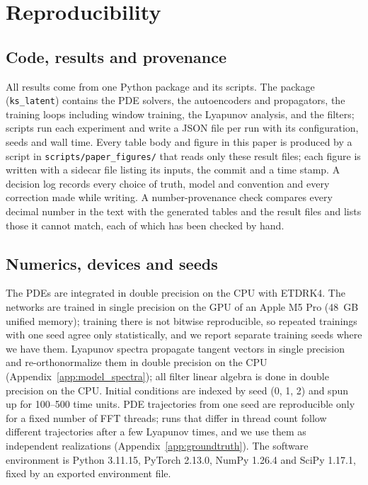 \section{Reproducibility}
\label{app:reproducibility}

\subsection{Code, results and provenance}

All results come from one Python package and its scripts. The package
(\texttt{ks\_latent}) contains the PDE solvers, the autoencoders and
propagators, the training loops including window training, the
Lyapunov analysis, and the filters; scripts run each experiment and write
a JSON file per run with its configuration, seeds and wall time. Every
table body and figure in this paper is produced by a script in
\texttt{scripts/paper\_figures/} that reads only these result files; each
figure is written with a sidecar file listing its inputs, the commit and a
time stamp. A decision log records every choice of truth, model and
convention and every correction made while writing. A number-provenance
check compares every decimal number in the text with the generated
tables and the result files and lists those it cannot match, each of
which has been checked by hand.

\subsection{Numerics, devices and seeds}

The PDEs are integrated in double precision on the CPU with ETDRK4. The
networks are trained in single precision on the GPU of an Apple M5 Pro
(48~GB unified memory); training there is not bitwise reproducible, so
repeated trainings with one seed agree only statistically, and we report
separate training seeds where we have them. Lyapunov spectra propagate
tangent vectors in single precision and re-orthonormalize them in double
precision on the CPU (Appendix~\ref{app:model_spectra}); all filter linear
algebra is done in double precision on the CPU. Initial conditions are
indexed by seed (0, 1, 2) and spun up for 100--500 time units. PDE
trajectories from one seed are reproducible only for a fixed number of
FFT threads; runs that differ in thread count follow different
trajectories after a few Lyapunov times, and we use them as independent
realizations (Appendix~\ref{app:groundtruth}). The software environment
is Python 3.11.15, PyTorch 2.13.0, NumPy 1.26.4 and SciPy 1.17.1, fixed by
an exported environment file.

